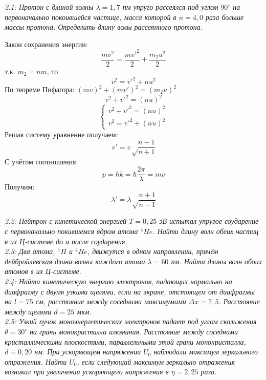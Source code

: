 
    \emph{2.1: Протон с длиной волны \( \lambda = 1,7 \) пм упруго
    	рассеялся под углом \( 90^{\circ} \) на первоначально покоившейся 
    	частице, масса которой в \( n = 4,0 \) раза больше массы протона. 
    	Определить длину волы рассеянного протона.}

        Закон сохранения энергии: 
        \[
            \frac{mv^2}{2} = \frac{mv'^2}{2} + \frac{m_2u^2}{2}
        \]
        т.к. \( m_2 = nm \), то
        \[ v^2 = v'^2 + nu^2 \]
        По теореме Пифагора: \( (mv)^2 + (mv')^2 = (m_2u)^2 \)
        \[ v^2 + v'^2 = (nu)^2 \]
        \begin{equation*}
            \left\{\begin{aligned}
                v^2 + v'^2 = (nu)^2 \\
                v^2 = v'^2 + (nu)^2
            \end{aligned}\right.
        \end{equation*}
        Решая систему уравнение получаем:
        \[ v' = v\sqrt\frac{n-1}{n+1} \]
        С учётом соотношения:
        \[ p = \hbar k = \hbar\frac{2\pi}{\lambda} = mv \]
        Получим: 
        \[ \lambda' = \lambda\sqrt\frac{n+1}{n-1} \]
    
    \emph{2.2: Нейтрон с кинетической энергией \( T = 0,25 \) эВ 
        испытал упругое соударение с первоначально покившемся ядром атома 
        \( ^4He \). Найти длину волн обеих частиц в их Ц-системе до и 
        после соударения.}\\

    \emph{2.3: Два атома, \( ^1H \) и \( ^4He \), движутся в одном 
        направлении, причём дейбройлевская длина волны каждого атома 
        \( \lambda = 60 \) пм. Найти длины волн обоих атомов в их 
        Ц-системе.}\\

    \emph{2.4: Найти кинетическую энергию электронов, падающих нормально 
        на диафрагму с двумя узкими щелями, если на экране, отстоящем от 
        диафрагмы на \( l = 75 \) см, расстояние между соседними 
        максимумами \( \Delta x = 7,5 \). Расстояние между щелями 
        \( d = 25 \) мкм.}\\

	\emph{2.5: Узкий пучок моноэнергетических электронов падает под углом
		скольжения \( \theta = 30^\circ \) на грань монокристалла алюминия. 
		Расстояние между соседними кристаллическими плоскостями, 
		параллельными этой грани монокристалла, \( d = 0,20 \) нм. 
		При ускоряющем напряжении \( U_0 \) наблюдали
		максимум зеркального отражения. Найти \( U_0 \), если следующий 
		максимум зеркально отражения возникал при увеличении ускоряющего 
		напряжения в \( \eta = 2,25 \) раза.} \\

